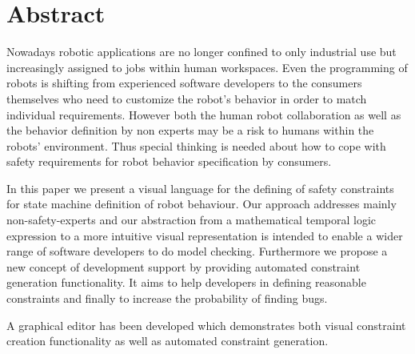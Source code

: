 \chapter*{Abstract}

Nowadays robotic applications are no longer confined to only industrial use but increasingly assigned to jobs within human workspaces. Even the programming of robots is shifting from experienced software developers to the consumers themselves who need to customize the robot's behavior in order to match individual requirements.
However both the human robot collaboration as well as the behavior definition by non experts may be a risk to humans within the robots' environment.
Thus special thinking is needed about how to cope with safety requirements for robot behavior specification by consumers.

In this paper we present a visual language for the defining of safety constraints for state machine definition of robot behaviour. Our approach addresses mainly non-safety-experts and our abstraction from a mathematical temporal logic expression to a more intuitive visual representation is intended to enable a wider range of software developers to do model checking.
Furthermore we propose a new concept of development support by providing automated constraint generation functionality. It aims to help developers in defining reasonable constraints and finally to increase the probability of finding bugs.

A graphical editor has been developed which demonstrates both visual constraint creation functionality as well as automated constraint generation.